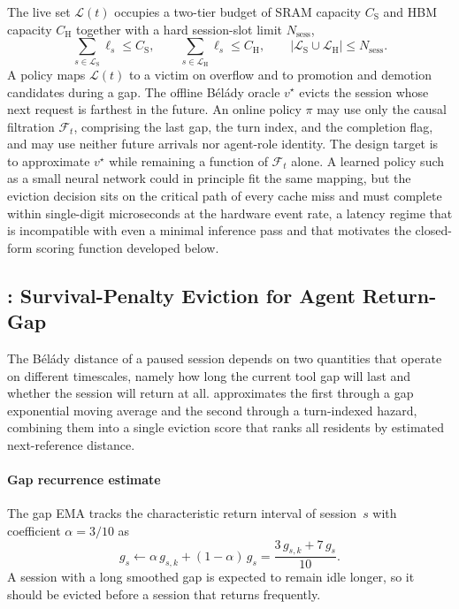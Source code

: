 The live set $\mathcal{L}(t)$ occupies a two-tier budget of SRAM
capacity $C_{\mathrm{S}}$ and HBM capacity $C_{\mathrm{H}}$ together
with a hard session-slot limit $N_{\mathrm{sess}}$,
\begin{equation}
  \sum_{s\in\mathcal{L}_{\mathrm{S}}}\ell_s\le C_{\mathrm{S}},
  \qquad
  \sum_{s\in\mathcal{L}_{\mathrm{H}}}\ell_s\le C_{\mathrm{H}},
  \qquad
  \lvert\mathcal{L}_{\mathrm{S}}\cup\mathcal{L}_{\mathrm{H}}\rvert
    \le N_{\mathrm{sess}}.
  \label{eq:cap}
\end{equation}
A policy maps $\mathcal{L}(t)$ to a victim on overflow and to
promotion and demotion candidates during a gap. The offline B\'el\'ady
oracle $v^{\star}$ evicts the session whose next request is farthest
in the future. An online policy $\pi$ may use only the causal
filtration $\mathcal{F}_{t}$, comprising the last gap, the turn index,
and the completion flag, and may use neither future arrivals nor agent-role
identity. The design target is to approximate $v^{\star}$ while
remaining a function of $\mathcal{F}_{t}$ alone. A learned policy
such as a small neural network could in principle fit the same
mapping, but the eviction decision sits on the critical path of every
cache miss and must complete within single-digit microseconds at the
hardware event rate, a latency regime that is incompatible with even a
minimal inference pass and that motivates the closed-form scoring
function developed below.

\subsection{\spear: Survival-Penalty Eviction for Agent Return-Gap}
\label{sec:esp}

The B\'el\'ady distance of a paused session depends on two quantities
that operate on different timescales, namely how long the current
tool gap will last and whether the session will return at all. \esp
approximates the first through a gap exponential moving average and
the second through a turn-indexed hazard, combining them into a
single eviction score that ranks all residents by estimated
next-reference distance.

\paragraph{Gap recurrence estimate}
The gap EMA tracks the characteristic return interval of session~$s$
with coefficient $\alpha{=}3/10$ as
\begin{equation}
  g_s
  \leftarrow
  \alpha\,g_{s,k}+(1-\alpha)\,g_s
  =\frac{3\,g_{s,k}+7\,g_s}{10}.
  \label{eq:ema}
\end{equation}
A session with a long smoothed gap is expected to remain idle longer,
so it should be evicted before a session that returns frequently.

